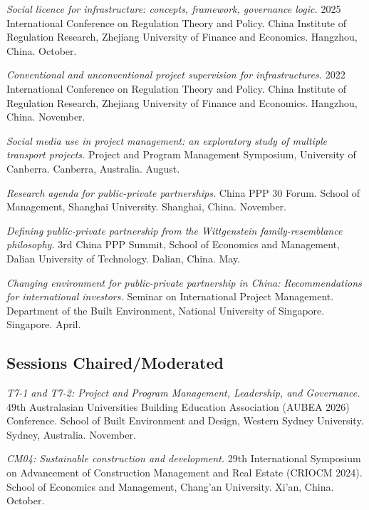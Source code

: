 \documentclass[11pt,a4paper]{report} %
\begin{document}
    \begin{tablist}

        \item[2025] \tab{}\textit{Social licence for infrastructure: concepts, framework, governance logic.} 2025 International Conference on Regulation Theory and Policy. China Institute of Regulation Research, Zhejiang University of Finance and Economics. Hangzhou, China. October.

        \item[2022] \tab{}\textit{Conventional and unconventional project supervision for infrastructures.} 2022 International Conference on Regulation Theory and Policy. China Institute of Regulation Research, Zhejiang University of Finance and Economics. Hangzhou, China. November.

        \item[2021] \tab{}\textit{Social media use in project management: an exploratory study of multiple transport projects.} Project and Program Management Symposium, University of Canberra. Canberra, Australia. August.

        \item[2018] \tab{}\textit{Research agenda for public-private partnerships.} China PPP 30 Forum. School of Management, Shanghai University. Shanghai, China. November.

        \item[2018] \tab{}\textit{Defining public-private partnership from the Wittgenstein family-resemblance philosophy.} 3rd China PPP Summit, School of Economics and Management, Dalian University of Technology. Dalian, China. May.

        \item[2013] \tab{}\textit{Changing environment for public-private partnership in China: Recommendations for international investors.} Seminar on International Project Management. Department of the Built Environment, National University of Singapore. Singapore. April.

    \end{tablist}

    \subsection*{Sessions Chaired/Moderated}

    \begin{tablist}

        \item[2026] \tab{}\textit{T7-1 and T7-2: Project and Program Management, Leadership, and Governance.} 49th Australasian Universities Building Education Association (AUBEA 2026) Conference. School of Built Environment and Design, Western Sydney University. Sydney, Australia. November.

        \item[2024] \tab{}\textit{CM04: Sustainable construction and development.} 29th International Symposium on Advancement of Construction Management and Real Estate (CRIOCM 2024). School of Economics and Management, Chang'an University. Xi'an, China. October.

    \end{tablist}
\end{document}
